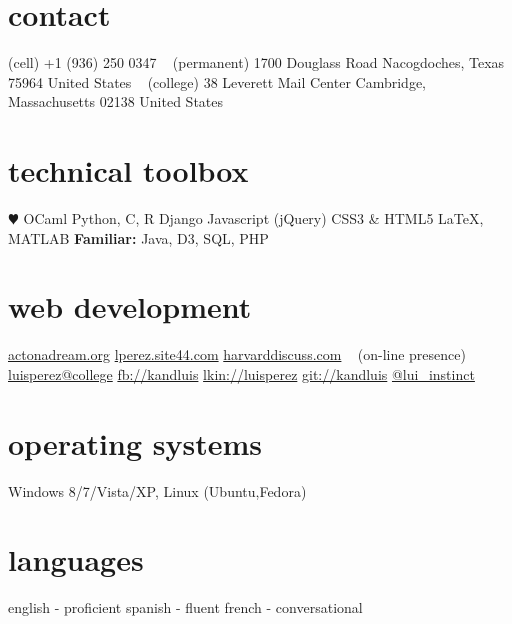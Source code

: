 \documentclass[]{friggeri-cv} %
\begin{document}


\begin{aside} %
\section{contact}
(cell)
+1 (936) 250 0347
~
(permanent)
1700 Douglass Road
Nacogdoches, Texas 75964
United States
~
(college)
38 Leverett Mail Center
Cambridge, Massachusetts 02138
United States
\section{technical toolbox}
{\color{red} $\varheartsuit$} OCaml
Python, C, R
Django
Javascript (jQuery)
CSS3 \& HTML5
\LaTeX, MATLAB
\textbf{Familiar:} Java, D3, SQL, PHP
\section{web development}
\href{http://www.actonadream.org/}{actonadream.org}
\href{http://lperez.site44.com}{lperez.site44.com}
\href{https://www.hcs.harvard.edu/~harvarddiscuss/index.php/en/}{harvarddiscuss.com}
~
(on-line presence)
\href{mailto:luisperez@college.harvard.edu}{luisperez@college}
\href{http://facebook.com/kandluis}{fb://kandluis}
\href{http://www.linkedin.com/pub/luis-perez/73/793/770}{lkin://luisperez}
\href{http://www.github.com/kandluis}{git://kandluis}
\href{http://www.twitter.com/lui\_instinct}{@lui\_instinct}
\section{operating systems}
Windows 8/7/Vista/XP, Linux (Ubuntu,Fedora)
\section{languages}
english - proficient
spanish - fluent
french - conversational
\end{aside}

\end{document}
